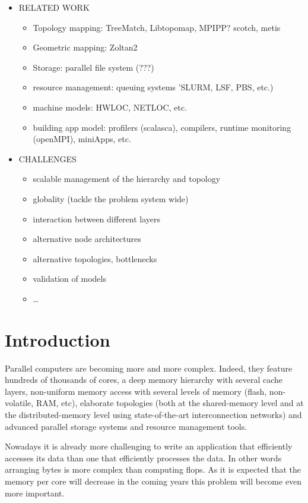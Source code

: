 \begin{itemize}
\item RELATED WORK

\begin{itemize}
\item Topology mapping: TreeMatch, Libtopomap, MPIPP? scotch, metis  
\item Geometric mapping: Zoltan2
\item Storage: parallel file system (???)
\item resource management: queuing systems 'SLURM, LSF, PBS, etc.)
\item machine models: HWLOC, NETLOC, etc. 
\item building app model: profilers (scalasca), compilers, runtime monitoring (openMPI), 
miniApps, etc. 
\end{itemize}

\item CHALLENGES

\begin{itemize}
\item scalable management of the hierarchy and topology
\item globality (tackle the problem system wide)
\item interaction between different layers
\item alternative node architectures
\item alternative topologies, bottlenecks
\item validation of models
\item \ldots
\end{itemize}

\end{itemize}

\section{Introduction}
 

Parallel computers are becoming more and more complex.  Indeed, they
feature hundreds of thousands of cores, a deep memory hierarchy with
several cache layers, non-uniform memory access with  several levels of
memory (flash, non-volatile, RAM, etc), elaborate topologies (both at
the shared-memory level and at the distributed-memory level using
state-of-the-art interconnection networks) and advanced parallel storage
systems and resource management tools.

Nowadays it is already more challenging to write an application that
efficiently accesses its data than one that efficiently processes the
data. In other words arranging bytes is more complex than computing
flops. As it is expected that the memory per core will decrease in the
coming years this problem will become even more important. 

